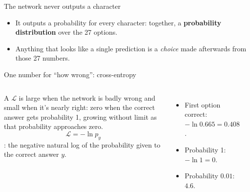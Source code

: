 \documentclass[aspectratio=169,11pt,t,\primeropts]{beamer}
\begin{document}
\begin{frame}{The network never outputs a character}
  \begin{itemize}
    \item It outputs a probability for every character: together, a \textbf{probability
      distribution} over the 27 options.
    \item Anything that looks like a single prediction is a \emph{choice} made afterwards from
      those 27 numbers.
  \end{itemize}
\end{frame}

\begin{frame}{One number for ``how wrong'': cross-entropy}
  \begin{columns}[T]
    A  $\mathcal{L}$ is large when the network is badly wrong and small when it's
    nearly right: zero when the correct answer gets probability 1, growing without limit as that
    probability approaches zero.
    \[ \mathcal{L} = -\ln p_y \]
    : the negative natural log of the probability given to the correct
    answer $y$.
    \begin{itemize}
      \item<2-> First option correct: $-\ln 0.665 = 0.408$.
      \item<3-> Probability 1: $-\ln 1 = 0$.
      \item<3-> Probability $0.01$: $4.6$.
    \end{itemize}
    \begin{center}
    \end{center}
  \end{columns}
\end{frame}
\end{document}
